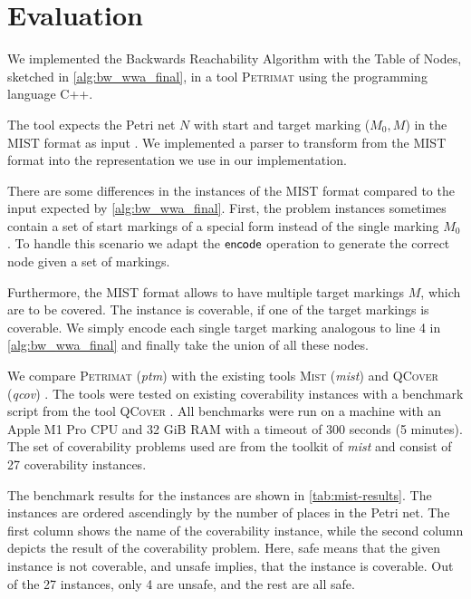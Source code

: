 \chapter{Evaluation}\label{chapter:evaluation}
We implemented the Backwards Reachability Algorithm with the Table of Nodes, sketched in \autoref{alg:bw_wwa_final}, in a tool \textsc{Petrimat} using the programming language C++. 

The tool expects the Petri net $N$ with start and target marking ($M_{0},M$) in the MIST format as input \cite{ganty_15}. We implemented a parser to transform from the MIST format into the representation we use in our implementation. 

There are some differences in the instances of the MIST format compared to the input expected by \autoref{alg:bw_wwa_final}. First, the problem instances sometimes contain a set of start markings of a special form instead of the single marking $M_{0}$. To handle this scenario we adapt the $\operatorname{\textsf{encode}}$ operation to generate the correct node given a set of markings. 

Furthermore, the MIST format allows to have multiple target markings $M$, which are to be covered. The instance is coverable, if one of the target markings is coverable. We simply encode each single target marking analogous to line 4 in \autoref{alg:bw_wwa_final} and finally take the union of all these nodes.

We compare \textsc{Petrimat} (\textit{ptm}) with the existing tools \textsc{Mist} (\textit{mist}) and \textsc{QCover} (\textit{qcov})  \cite{ganty_15,blondin_15}. 
The tools were tested on existing coverability instances with a benchmark script from the tool \textsc{QCover} \cite{blondin_15}.  All benchmarks were run on a machine with an Apple M1 Pro CPU and 32 GiB RAM with a timeout of 300 seconds (5 minutes). 
The set of coverability problems used are from the toolkit of \textit{mist} and consist of 27 coverability instances. 

\bigbreak

The benchmark results for the instances are shown in \autoref{tab:mist-results}.
The instances are ordered ascendingly by the number of places in the Petri net. The first column shows the name of the coverability instance, while the second column depicts the result of the coverability problem. Here, safe means that the given instance is not coverable, and unsafe implies, that the instance is coverable.
Out of the 27 instances, only 4 are unsafe, and the rest are all safe. 

